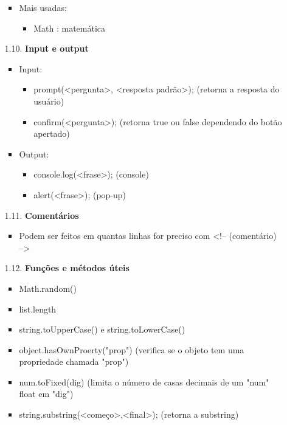 \documentclass[12pt, a4paper]{article} %
\begin{document}
\begin{enumerate}
\begin{enumerate}
\begin{itemize}
\item Mais usadas:
\begin{itemize}
\item Math : matemática
\end{itemize}
\end{itemize}
\item[1.10.] \textbf{Input e output}
\begin{itemize}
\item Input:
\begin{itemize}
\item prompt(<pergunta>, <resposta padrão>); (retorna a resposta do usuário)
\item confirm(<pergunta>); (retorna true ou false dependendo do botão apertado)
\end{itemize}
\item Output:
\begin{itemize}
\item console.log(<frase>); (console)
\item alert(<frase>); (pop-up)
\end{itemize}
\end{itemize}
\item[1.11.] \textbf{Comentários}
\begin{itemize}
\item Podem ser feitos em quantas linhas for preciso com <!-- (comentário) -->
\end{itemize}
\item[1.12.] \textbf{Funções e métodos úteis}
\begin{itemize}
\item Math.random()
\item list.length
\item string.toUpperCase() e string.toLowerCase()
\item object.hasOwnProerty("prop") (verifica se o objeto tem uma propriedade chamada "prop")
\item num.toFixed(dig) (limita o número de casas decimais de um "num" float em "dig")
\item string.substring(<começo>,<final>); (retorna a substring)
\end{itemize}
\end{enumerate}
\end{enumerate}
\end{document}
